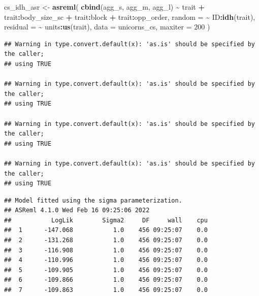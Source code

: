 \documentclass[
  12pt,
]{book}
\newenvironment{Shaded}{\begin{snugshade}}{\end{snugshade}}
\newcommand{\DataTypeTok}[1]{\textcolor[rgb]{0.13,0.29,0.53}{#1}}
\newcommand{\DecValTok}[1]{\textcolor[rgb]{0.00,0.00,0.81}{#1}}
\newcommand{\KeywordTok}[1]{\textcolor[rgb]{0.13,0.29,0.53}{\textbf{#1}}}
\newcommand{\NormalTok}[1]{#1}
\newcommand{\OperatorTok}[1]{\textcolor[rgb]{0.81,0.36,0.00}{\textbf{#1}}}
\newcommand{\OtherTok}[1]{\textcolor[rgb]{0.56,0.35,0.01}{#1}}
\newcommand{\StringTok}[1]{\textcolor[rgb]{0.31,0.60,0.02}{#1}}
\begin{document}
\begin{Shaded}
\begin{Highlighting}[]
\NormalTok{cs\_idh\_asr \textless{}{-}}\StringTok{ }\KeywordTok{asreml}\NormalTok{(}
  \KeywordTok{cbind}\NormalTok{(agg\_s, agg\_m, agg\_l) }\OperatorTok{\textasciitilde{}}\StringTok{ }\NormalTok{trait }\OperatorTok{+}\StringTok{ }\NormalTok{trait}\OperatorTok{:}\NormalTok{body\_size\_sc }\OperatorTok{+}
\StringTok{    }\NormalTok{trait}\OperatorTok{:}\NormalTok{block }\OperatorTok{+}
\StringTok{    }\NormalTok{trait}\OperatorTok{:}\NormalTok{opp\_order,}
  \DataTypeTok{random =} \OperatorTok{\textasciitilde{}}\StringTok{ }\NormalTok{ID}\OperatorTok{:}\KeywordTok{idh}\NormalTok{(trait),}
  \DataTypeTok{residual =} \OperatorTok{\textasciitilde{}}\StringTok{ }\NormalTok{units}\OperatorTok{:}\KeywordTok{us}\NormalTok{(trait),}
  \DataTypeTok{data =}\NormalTok{ unicorns\_cs,}
  \DataTypeTok{maxiter =} \DecValTok{200}
\NormalTok{)}
\end{Highlighting}
\end{Shaded}

\begin{verbatim}
## Warning in type.convert.default(x): 'as.is' should be specified by the caller;
## using TRUE

## Warning in type.convert.default(x): 'as.is' should be specified by the caller;
## using TRUE

## Warning in type.convert.default(x): 'as.is' should be specified by the caller;
## using TRUE

## Warning in type.convert.default(x): 'as.is' should be specified by the caller;
## using TRUE
\end{verbatim}

\begin{verbatim}
## Model fitted using the sigma parameterization.
## ASReml 4.1.0 Wed Feb 16 09:25:06 2022
##           LogLik        Sigma2     DF     wall    cpu
##  1      -147.068           1.0    456 09:25:07    0.0
##  2      -131.268           1.0    456 09:25:07    0.0
##  3      -116.908           1.0    456 09:25:07    0.0
##  4      -110.996           1.0    456 09:25:07    0.0
##  5      -109.905           1.0    456 09:25:07    0.0
##  6      -109.866           1.0    456 09:25:07    0.0
##  7      -109.863           1.0    456 09:25:07    0.0
\end{verbatim}

\begin{Shaded}
\end{Shaded}
\end{document}
